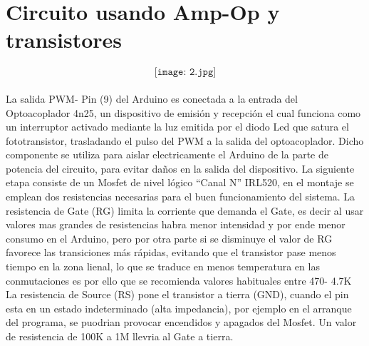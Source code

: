 \documentclass[12pt,a4paper]{article}
\begin{document}
\section{Circuito usando Amp-Op y transistores}
$$\texttt{[image: 2.jpg]}$$ \\
La salida PWM- Pin (9) del Arduino  es conectada a la entrada del Optoacoplador 4n25, un dispositivo de emisión y recepción el cual funciona como un interruptor activado mediante la luz emitida por el diodo Led que satura el fototransistor, trasladando el pulso del PWM a la salida del optoacoplador. Dicho componente se utiliza para aislar electricamente el Arduino de la parte de potencia del circuito, para evitar daños en la salida del dispositivo.
La siguiente etapa consiste de un Mosfet de nivel lógico “Canal N” IRL520, en el montaje se emplean dos resistencias necesarias para el buen funcionamiento del sistema.
La resistencia de Gate (RG) limita la corriente que demanda el Gate, es decir al usar valores mas grandes de resistencias habra menor intensidad y por ende menor consumo en el Arduino, pero por otra parte si se disminuye el valor de RG favorece las transiciones más rápidas, evitando que el transistor pase menos tiempo en la zona lienal, lo que se traduce en menos temperatura en las conmutaciones es por ello que se recomienda valores habituales entre 470- 4.7K
La resistencia de Source (RS) pone el transistor a tierra (GND), cuando el pin esta en un estado indeterminado (alta impedancia), por ejemplo en el arranque del programa, se puodrian provocar encendidos y apagados del Mosfet. Un valor de resistencia de 100K a 1M llevria al Gate a tierra.
\end{document}
